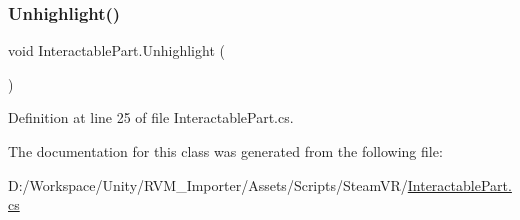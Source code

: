 \subsubsection{\texorpdfstring{Unhighlight()}{Unhighlight()}}
{\footnotesize\ttfamily void Interactable\+Part.\+Unhighlight (\begin{DoxyParamCaption}{ }\end{DoxyParamCaption})}



Definition at line 25 of file Interactable\+Part.\+cs.



The documentation for this class was generated from the following file\+:\begin{DoxyCompactItemize}
\item 
D\+:/\+Workspace/\+Unity/\+R\+V\+M\+\_\+\+Importer/\+Assets/\+Scripts/\+Steam\+V\+R/\mbox{\hyperlink{_interactable_part_8cs}{Interactable\+Part.\+cs}}\end{DoxyCompactItemize}
